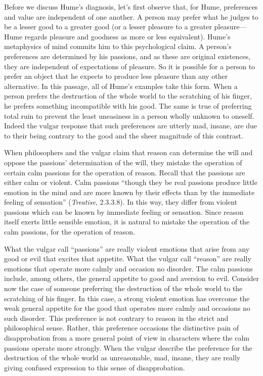 Before we discuss Hume's diagnosis, let's first observe that, for Hume, preferences and value are independent of one another. A person may prefer what he judges to be a lesser good to a greater good (or a lesser pleasure to a greater pleasure---Hume regards pleasure and goodness as more or less equivalent). Hume's metaphysics of mind commits him to this psychological claim. A person's preferences are determined by his passions, and as these are original existences, they are independent of expectations of pleasure. So it is possible for a person to prefer an object that he expects to produce less pleasure than any other alternative. In this passage, all of Hume's examples take this form. When a person prefers the destruction of the whole world to the scratching of his finger, he prefers something incompatible with his good. The same is true of preferring total ruin to prevent the least uneasiness in a person wholly unknown to oneself. Indeed the vulgar response that such preferences are utterly mad, insane, are due to their being contrary to the good and the sheer magnitude of this contrast.

When philosophers and the vulgar claim that reason can determine the will and oppose the passions' determination of the will, they mistake the operation of certain calm passions for the operation of reason. Recall that the passions are either calm or violent. Calm passions ``though they be real passions produce little emotion in the mind and are more known by their effects than by the immediate feeling of sensation'' (\emph{Treatise}, 2.3.3.8). In this way, they differ from violent passions which can be known by immediate feeling or sensation. Since reason itself exerts little sensible emotion, it is natural to mistake the operation of the calm passions, for the operation of reason.

What the vulgar call ``passions'' are really violent emotions that arise from any good or evil that excites that appetite. What the vulgar call ``reason'' are really emotions that operate more calmly and occasion no disorder. The calm passions include, among others, the general appetite to good and aversion to evil. Consider now the case of someone preferring the destruction of the whole world to the scratching of his finger. In this case, a strong violent emotion has overcome the weak general appetite for the good that operates more calmly and occasions no such disorder. This preference is not contrary to reason in the strict and philosophical sense. Rather, this preference occasions the distinctive pain of disapprobation from a more general point of view in characters where the calm passions operate more strongly. When the vulgar describe the preference for the destruction of the whole world as unreasonable, mad, insane, they are really giving confused expression to this sense of disapprobation. \change

